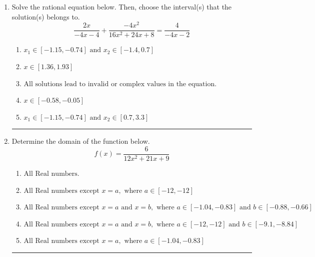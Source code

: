 \documentclass[14pt]{extbook}
\newcommand{\litem}[1]{\item#1\hspace*{-1cm}\rule{\textwidth}{0.4pt}}
\begin{document}
\begin{enumerate}
\litem{
Solve the rational equation below. Then, choose the interval(s) that the solution(s) belongs to.\[ \frac{2x}{-4x -4} + \frac{-4x^{2}}{16x^{2} +24 x + 8} = \frac{4}{-4x -2} \]\begin{enumerate}[label=\Alph*.]
\item \( x_1 \in [-1.15, -0.74] \text{ and } x_2 \in [-1.4,0.7] \)
\item \( x \in [1.36,1.93] \)
\item \( \text{All solutions lead to invalid or complex values in the equation.} \)
\item \( x \in [-0.58,-0.05] \)
\item \( x_1 \in [-1.15, -0.74] \text{ and } x_2 \in [0.7,3.3] \)

\end{enumerate} }
\litem{
Determine the domain of the function below.\[ f(x) = \frac{6}{12x^{2} +21 x + 9} \]\begin{enumerate}[label=\Alph*.]
\item \( \text{All Real numbers.} \)
\item \( \text{All Real numbers except } x = a, \text{ where } a \in [-12, -12] \)
\item \( \text{All Real numbers except } x = a \text{ and } x = b, \text{ where } a \in [-1.04, -0.83] \text{ and } b \in [-0.88, -0.66] \)
\item \( \text{All Real numbers except } x = a \text{ and } x = b, \text{ where } a \in [-12, -12] \text{ and } b \in [-9.1, -8.84] \)
\item \( \text{All Real numbers except } x = a, \text{ where } a \in [-1.04, -0.83] \)


\end{enumerate}}
\end{enumerate}
\end{document}

